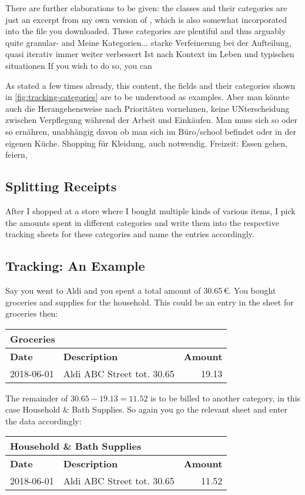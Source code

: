 There are further elaborations to be given:
the classes and their categories are just an excerpt from my own version of \tfn, which is also somewhat incorporated into the file you downloaded.
These categories are plentiful and thus arguably quite granular-
and Meine Kategorien... starke Verfeinerung bei der Aufteilung, quasi iterativ immer weiter verbessert
Ist nach Kontext im Leben und typischen situationen
If you wish to do so, you can

As stated a few times already, this content, the fields and their categories shown in \autoref{fig:tracking-categories} are to be understood as examples.
Aber man könnte auch die Herangehensweise nach Prioritäten vornehmen, keine UNterscheidung zwischen Verpflegung während der Arbeit und Einkäufen.
Man muss sich so oder so ernähren, unabhängig davon ob man sich im Büro/school befindet oder in der eigenen Küche.
Shopping für Kleidung, auch notwendig.
Freizeit: Essen gehen, feiern, 

\subsection{Splitting Receipts}
\label{subsec:splitting-receipts}

After I shopped at a store where I bought multiple kinds of various items, I pick the amounts spent in different categories and write them into the respective tracking sheets for these categories and name the entries accordingly.

\subsection{Tracking: An Example}
\label{subsec:tracking-example}

Say you went to Aldi and you spent a total amount of 30.65\,€.
You bought groceries and supplies for the household.
This could be an entry in the sheet for groceries then:
\begin{center}\sffamily
	\begin{tabular}{|l|l|r|}
		\multicolumn{3}{l}{Groceries}\\
		\hline
		\textbf{Date} & \textbf{Description} & \textbf{Amount}\rmfamily\\
		\hline
		2018-06-01 & Aldi ABC Street tot. 30.65 & 19.13\\
		\hline
	\end{tabular}
\end{center}

The remainder of \( 30.65 - 19.13 = 11.52\) is to be billed to another category, in this case Household \& Bath Supplies.
So again you go the relevant sheet and enter the data accordingly:
\begin{center}\sffamily
	\begin{tabular}{|l|l|r|}
		\multicolumn{3}{l}{Household \& Bath Supplies}\\			
		\hline
		\textbf{Date} & \textbf{Description} & \textbf{Amount}\\
		\hline
		2018-06-01 & Aldi ABC Street tot. 30.65 & 11.52\\
		\hline
	\end{tabular}
\end{center}

